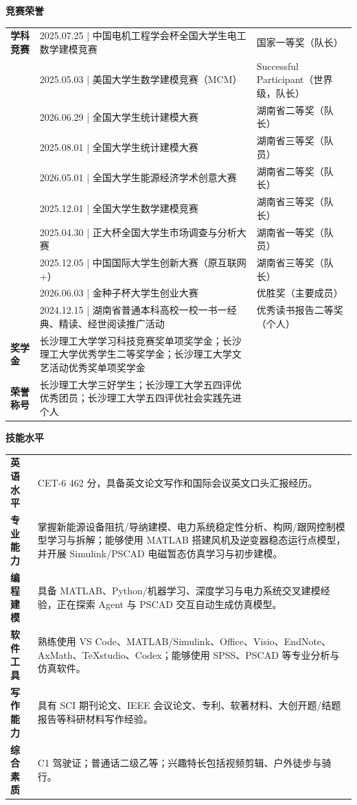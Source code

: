\documentclass[UTF8,a4paper,10pt]{ctexart}
\newcommand{\sectiontitle}[1]{%
  \vspace{0.48em}
  {\sffamily\bfseries\Large\color{resumeblue}#1}\par
  \vspace{-0.28em}{\color{resumeblue}\rule{2.35cm}{1.05pt}}{\color{softline}\rule{\dimexpr\linewidth-2.35cm\relax}{1.05pt}}\vspace{0.13em}
}
\begin{document}
\newpage
\sectiontitle{竞赛荣誉}
\begin{tabularx}{\linewidth}{L{2.25cm}L{10.95cm}Y}
\textbf{学科竞赛} & 2025.07.25 | 中国电机工程学会杯全国大学生电工数学建模竞赛 & 国家一等奖（队长）\\
 & 2025.05.03 | 美国大学生数学建模竞赛（MCM） & Successful Participant（世界级，队长）\\
 & 2026.06.29 | 全国大学生统计建模大赛 & 湖南省二等奖（队长）\\
 & 2025.08.01 | 全国大学生统计建模大赛 & 湖南省三等奖（队员）\\
 & 2026.05.01 | 全国大学生能源经济学术创意大赛 & 湖南省二等奖（队长）\\
 & 2025.12.01 | 全国大学生数学建模竞赛 & 湖南省三等奖（队长）\\
 & 2025.04.30 | 正大杯全国大学生市场调查与分析大赛 & 湖南省一等奖（队员）\\
 & 2025.12.05 | 中国国际大学生创新大赛（原互联网+） & 湖南省三等奖（队长）\\
 & 2026.06.03 | 金种子杯大学生创业大赛 & 优胜奖（主要成员）\\
 & 2024.12.15 | 湖南省普通本科高校一校一书一经典、精读、经世阅读推广活动 & 优秀读书报告二等奖（个人）\\[0.12em]
\textbf{奖学金} & 长沙理工大学学习科技竞赛奖单项奖学金；长沙理工大学优秀学生二等奖学金；长沙理工大学文艺活动优秀奖单项奖学金 & \\
\textbf{荣誉称号} & 长沙理工大学三好学生；长沙理工大学五四评优优秀团员；长沙理工大学五四评优社会实践先进个人 & \\
\end{tabularx}

\sectiontitle{技能水平}
\begin{tabularx}{\linewidth}{L{2.25cm}Y}
\textbf{英语水平} & CET-6 462 分，具备英文论文写作和国际会议英文口头汇报经历。\\
\textbf{专业能力} & 掌握新能源设备阻抗/导纳建模、电力系统稳定性分析、构网/跟网控制模型学习与拆解；能够使用 MATLAB 搭建风机及逆变器稳态运行点模型，并开展 Simulink/PSCAD 电磁暂态仿真学习与初步建模。\\
\textbf{编程建模} & 具备 MATLAB、Python/机器学习、深度学习与电力系统交叉建模经验，正在探索 Agent 与 PSCAD 交互自动生成仿真模型。\\
\textbf{软件工具} & 熟练使用 VS Code、MATLAB/Simulink、Office、Visio、EndNote、AxMath、TeXstudio、Codex；能够使用 SPSS、PSCAD 等专业分析与仿真软件。\\
\textbf{写作能力} & 具有 SCI 期刊论文、IEEE 会议论文、专利、软著材料、大创开题/结题报告等科研材料写作经验。\\
\textbf{综合素质} & C1 驾驶证；普通话二级乙等；兴趣特长包括视频剪辑、户外徒步与骑行。\\
\end{tabularx}
\end{document}
